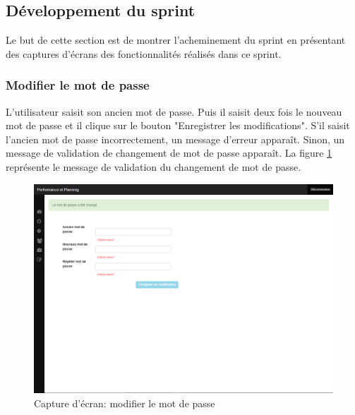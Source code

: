 \subsection{Développement du sprint}
Le but de cette section est de montrer l'acheminement du sprint en présentant des captures d'écrans des fonctionnalités réalisés dans ce sprint.

\subsubsection{Modifier le mot de passe}
L'utilisateur saisit son ancien mot de passe. Puis il saisit deux fois le nouveau mot de passe et il clique sur le bouton "Enregistrer les modifications". S'il saisit l'ancien mot de passe incorrectement, un message d'erreur apparaît. Sinon, un message de validation de changement de mot de passe apparaît. La figure \ref{code94} représente le message de validation du changement de mot de passe.
\begin{figure}[H]
  \centering
 \includegraphics[scale=0.37]{figures/printscreen_app/10_6.PNG}
 \caption{Capture d'écran: modifier le mot de passe}
 \label{code94}
\end{figure}


